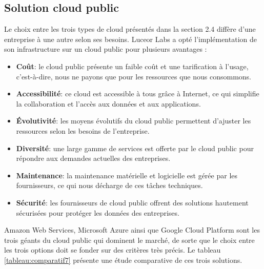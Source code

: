 \subsection{Solution cloud public}
Le choix entre les trois types de cloud présentés dans la section 2.4 diffère d'une entreprise à une autre selon ses besoins. Luceor Labs a opté l'implémentation de son infrastructure sur un cloud public pour plusieurs avantages \cite{Ranger2022} :
\begin{itemize}
\item  \textbf{Coût}: le cloud public présente un faible coût et une tarification à l'usage, c'est-à-dire, nous ne payons que pour les ressources que nous consommons.
 \item  \textbf{Accessibilité}: ce cloud est accessible à tous grâce à Internet, ce qui simplifie la collaboration et l'accès aux données et aux applications.
\item  \textbf{Évolutivité}: les moyens évolutifs du cloud public permettent d'ajuster les ressources selon les besoins de l'entreprise.
\item  \textbf{Diversité}: une large gamme de services est offerte par le cloud public pour répondre aux demandes actuelles des entreprises.
\item  \textbf{Maintenance}: la maintenance matérielle et logicielle est gérée par les fournisseurs, ce qui nous décharge de ces tâches techniques.
\item  \textbf{Sécurité}: les fournisseurs de cloud public offrent des solutions hautement sécurisées pour protéger les données des entreprises.

\end{itemize}
Amazon Web Services, Microsoft Azure ainsi que Google Cloud Platform sont les trois géants du cloud public qui dominent le marché, de sorte que le choix entre les trois options doit se fonder sur des critères très précis. Le tableau \ref{tableau:comparatif7} \cite{gil2023} présente une étude comparative de ces trois solutions.
